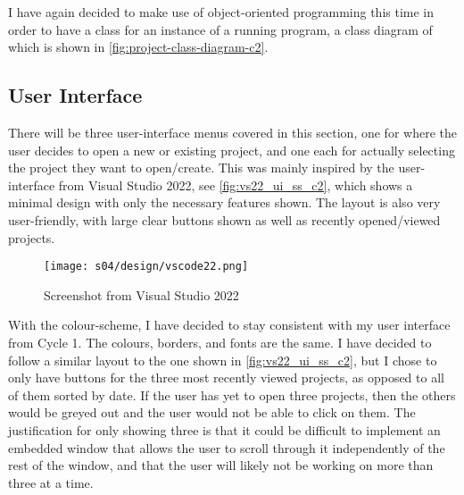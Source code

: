         I have again decided to make use of object-oriented programming this time in order to have a class for an instance of a running program, a class diagram of which is shown in \autoref{fig:project-class-diagram-c2}.

    \subsection{User Interface} 


        

        There will be three user-interface menus covered in this section, one for where the user decides to open a new or existing project, and one each for actually selecting the project they want to open/create. 
        This was mainly inspired by the user-interface from Visual Studio 2022, see \autoref{fig:vs22_ui_ss_c2}, which shows a minimal design with only the necessary features shown.
        The layout is also very user-friendly, with large clear buttons shown as well as recently opened/viewed projects.

        \begin{figure}[!ht]
            \centering
            \texttt{[image: s04/design/vscode22.png]}
            \caption{Screenshot from Visual Studio 2022}
            \label{fig:vs22_ui_ss_c2}
        \end{figure}

        With the colour-scheme, I have decided to stay consistent with my user interface from Cycle 1. The colours, borders, and fonts are the same. 
        I have decided to follow a similar layout to the one shown in \autoref{fig:vs22_ui_ss_c2}, but I chose to only have buttons for the three most recently viewed projects, as opposed to all of them sorted by date. 
        If the user has yet to open three projects, then the others would be greyed out and the user would not be able to click on them. 
        The justification for only showing three is that it could be difficult to implement an embedded window that allows the user to scroll through it independently of the rest of the window, and that the user will likely not be working on more than three at a time. 

